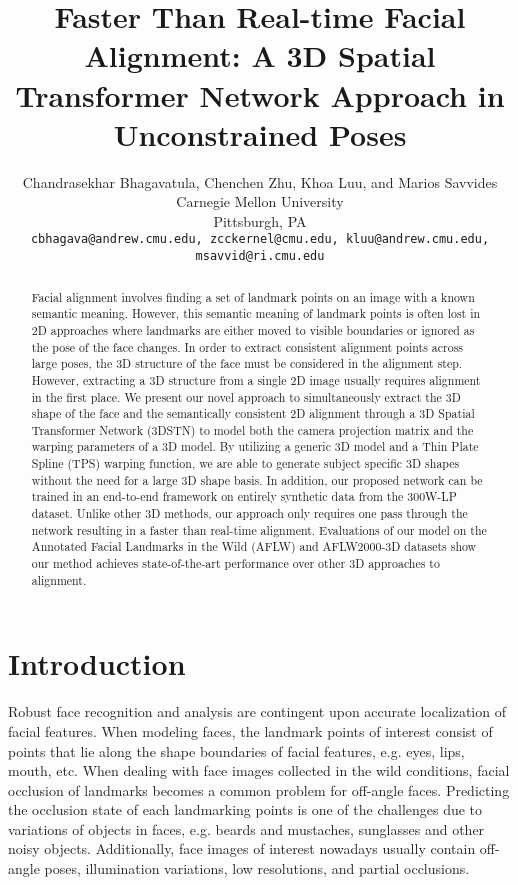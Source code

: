 \documentclass[10pt,twocolumn,letterpaper]{article}
\begin{document}
\title{Faster Than Real-time Facial Alignment: A 3D Spatial Transformer Network Approach in Unconstrained Poses}
\author{Chandrasekhar Bhagavatula, Chenchen Zhu, Khoa Luu, and Marios Savvides\\
Carnegie Mellon University\\
Pittsburgh, PA\\
{\tt\small cbhagava@andrew.cmu.edu, zcckernel@cmu.edu, kluu@andrew.cmu.edu,  msavvid@ri.cmu.edu}
}

\maketitle


\begin{abstract}
Facial alignment involves finding a set of landmark points on an image with a known semantic meaning. However, this semantic meaning of landmark points is often lost in 2D approaches where landmarks are either moved to visible boundaries or ignored as the pose of the face changes. In order to extract consistent alignment points across large poses, the 3D structure of the face must be considered in the alignment step. However, extracting a 3D structure from a single 2D image usually requires alignment in the first place. We present our novel approach to simultaneously extract the 3D shape of the face and the semantically consistent 2D alignment through a 3D Spatial Transformer Network (3DSTN) to model both the camera projection matrix and the warping parameters of a 3D model. By utilizing a generic 3D model and a Thin Plate Spline (TPS) warping function, we are able to generate subject specific 3D shapes without the need for a large 3D shape basis. In addition, our proposed network can be trained in an end-to-end framework on entirely synthetic data from the 300W-LP dataset. Unlike other 3D methods, our approach only requires one pass through the network resulting in a faster than real-time alignment. Evaluations of our model on the Annotated Facial Landmarks in the Wild (AFLW) and AFLW2000-3D datasets show our method achieves state-of-the-art performance over other 3D approaches to alignment.
\end{abstract}

\section{Introduction}

Robust face recognition and analysis are contingent upon accurate localization of facial features.  When modeling faces, the landmark points of interest consist of points that lie along the shape boundaries of facial features, e.g. eyes, lips, mouth, etc. When dealing with face images collected in the wild conditions, facial occlusion of landmarks becomes a common problem for off-angle faces.
Predicting the occlusion state of each landmarking points is one of the challenges due to variations of objects in faces, e.g. beards and mustaches, sunglasses and other noisy objects. Additionally, face images of interest nowadays usually contain off-angle poses, illumination variations, low resolutions, and partial occlusions. 
\end{document}
